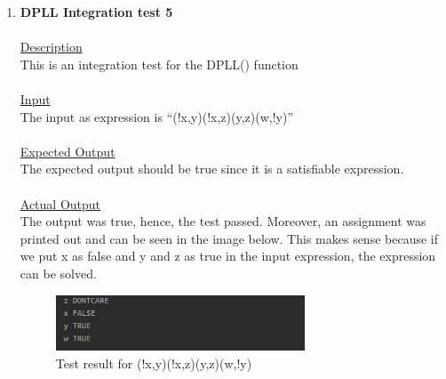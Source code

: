 \documentclass{article}
\newcommand{\quotes}[1]{``#1''}
\begin{document}
\begin{enumerate}
\item \textbf{DPLL Integration test 5}\\\\
		\underline{Description}\\
		\indent This is an integration test for the DPLL() function\\\\
		\underline{Input}\\
		\indent The input as expression is \quotes{(!x,y)(!x,z)(y,z)(w,!y)}\\	\\
		\underline{Expected Output}\\
		\indent The expected output should be true since it is a satisfiable expression.\\\\
		\underline{Actual Output}\\
		The output was true, hence, the test passed. Moreover, an assignment was printed out and can be seen in the image below. This makes sense because if we put x as false and y and z as true in the input expression, the expression can be solved. 
				\begin{figure}[H]
					\centering
			 			\includegraphics[width=0.7\textwidth]{dplltest5.png}
			 			\centering
			  			\caption{Test result for (!x,y)(!x,z)(y,z)(w,!y)}
			  			\label{fig:dplltest5}
					\end{figure}		
		

\end{enumerate}
\end{document}
